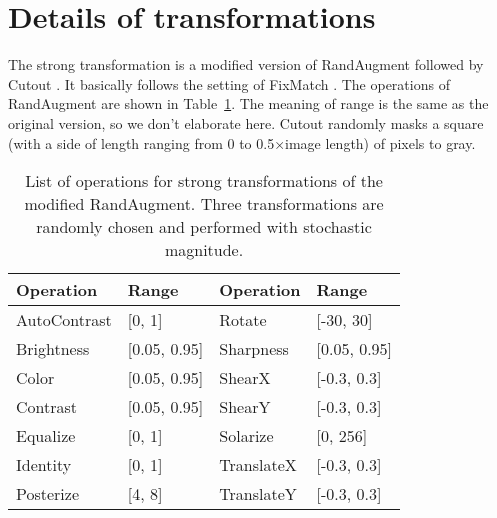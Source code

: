 \documentclass[letterpaper]{article} \usepackage{aaai23}  \usepackage{times}  \usepackage{helvet}  \usepackage{courier}  \usepackage[hyphens]{url}  \usepackage{graphicx} \urlstyle{rm} \def\UrlFont{\rm}  \usepackage{natbib}  \usepackage{caption} \frenchspacing  \setlength{\pdfpagewidth}{8.5in} \setlength{\pdfpageheight}{11in} \usepackage{algorithm}
\begin{document}
\section{Details of transformations}
\label{Details of transformations}
The strong transformation is a modified version of RandAugment \cite{cubuk2020randaugment} followed by Cutout \cite{devries2017improved}.
It basically follows the setting of FixMatch \cite{sohn2020fixmatch}.
The operations of RandAugment are shown in Table~\ref{strongaug}.
The meaning of range is the same as the original version, so we don't elaborate here.
Cutout randomly masks a square (with a side of length ranging from 0 to 0.5×image length) of pixels to gray. 

\begin{table}[H]
    \centering
    \caption{
        List of operations for strong transformations of the modified RandAugment. 
        Three transformations are randomly chosen and performed with stochastic magnitude.
    }
    \label{strongaug}
    \begin{tabular}{ll|ll}
        \toprule
        Operation      & Range        & Operation      & Range        \\ \midrule
        AutoContrast   & [0, 1]       & Rotate         & [-30, 30]    \\
        Brightness     & [0.05, 0.95] & Sharpness      & [0.05, 0.95] \\
        Color          & [0.05, 0.95] & ShearX         & [-0.3, 0.3]  \\
        Contrast       & [0.05, 0.95] & ShearY         & [-0.3, 0.3]  \\
        Equalize       & [0, 1]       & Solarize       & [0, 256]     \\
        Identity       & [0, 1]       & TranslateX     & [-0.3, 0.3]  \\
        Posterize      & [4, 8]       & TranslateY     & [-0.3, 0.3]  \\
        \bottomrule
    \end{tabular}
\end{table}
\end{document}
